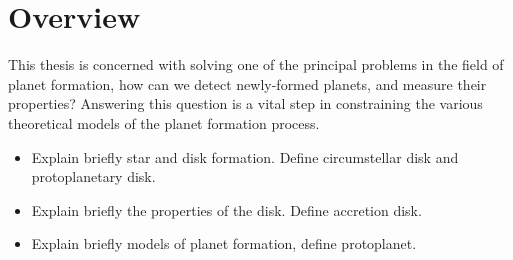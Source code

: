 \section{Overview}

This thesis is concerned with solving one of the principal problems in the field of planet formation, how can we detect newly-formed planets, and measure their properties?
Answering this question is a vital step in constraining the various theoretical models of the planet formation process.

\begin{itemize}
    \item Explain briefly star and disk formation. Define circumstellar disk and protoplanetary disk.
    \item Explain briefly the properties of the disk. Define accretion disk.
    \item Explain briefly models of planet formation, define protoplanet.
\end{itemize}



